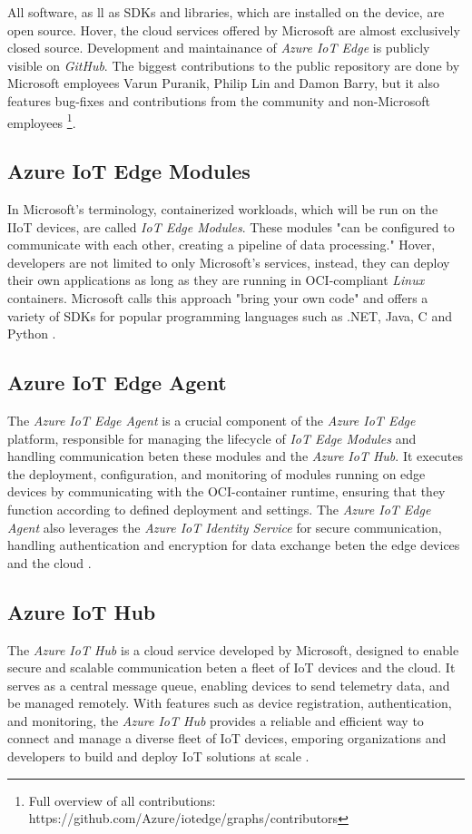 All software, as ll as \ac{SDK}s and
libraries, which are installed on the device, are open source. Hover, the
cloud services offered by Microsoft are almost exclusively closed source.
Development and maintainance of \textit{Azure IoT Edge} is publicly visible on
\textit{GitHub}. The biggest contributions
to the public repository are done by Microsoft employees Varun Puranik,
Philip Lin and Damon Barry, but it also features bug-fixes and contributions
from the community and non-Microsoft employees
\footnote{Full overview of all contributions: https://github.com/Azure/iotedge/graphs/contributors}.

\subsection{Azure IoT Edge Modules}
In Microsoft's terminology, containerized workloads, which will be run on the \ac{IIoT}
devices, are called \textit{IoT Edge Modules}. These modules "can be configured to
communicate with each other, creating a pipeline of data processing." Hover, developers are
not limited to only Microsoft's services, instead, they can deploy their own
applications as long as they are running in \ac{OCI}-compliant \textit{Linux} containers.
Microsoft calls this approach "bring your own code" and offers a variety of
\ac{SDK}s for popular programming languages such as .NET, Java, C and Python
\cite{msdoc-supportetplatforms}.

\subsection{Azure IoT Edge Agent}
The \textit{Azure IoT Edge Agent} is a crucial component of the \textit{Azure IoT Edge}
platform, responsible for managing the lifecycle of \textit{IoT Edge Modules} and
handling communication beten these modules and the \textit{Azure IoT Hub}.
It executes the deployment, configuration, and monitoring of modules running on
edge devices by communicating with the \ac{OCI}-container runtime,
ensuring that they function according to defined deployment and settings.
The \textit{Azure IoT Edge Agent} also leverages the \textit{Azure IoT Identity Service}
for secure communication, handling authentication and encryption for data exchange
beten the edge devices and the cloud \cite{msdoc-aziotedge-arch}.


\subsection{Azure IoT Hub}
The \textit{Azure IoT Hub} is a cloud service developed by Microsoft, designed to
enable secure and scalable communication beten a fleet of \ac{IoT} devices and
the cloud. It serves as a central message queue, enabling devices to send telemetry
data, and be managed remotely. With features such as device registration,
authentication, and monitoring, the \textit{Azure IoT Hub} provides a reliable and efficient
way to connect and manage a diverse fleet of \ac{IoT} devices, emporing
organizations and developers to build and deploy \ac{IoT} solutions at scale \cite{msdoc-aziothub}.

